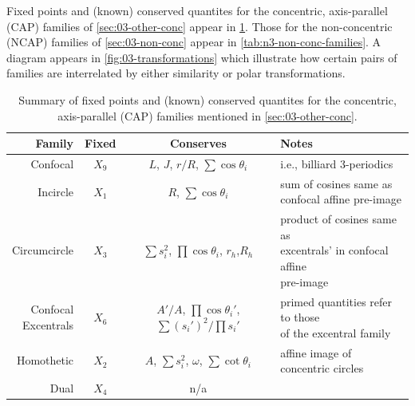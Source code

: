 Fixed points and (known) conserved quantites for the concentric, axis-parallel (CAP) families of \cref{sec:03-other-conc} appear in
\cref{tab:n3-conc-families}. Those for the non-concentric (NCAP) families of \cref{sec:03-non-conc} appear in
\cref{tab:n3-non-conc-families}. A diagram appears in \cref{fig:03-transformations} which illustrate how certain pairs of families are interrelated by either similarity or polar transformations.

\begin{table}
\centering
\begin{tabular}{|r|c|c|l|}
\hline
Family & Fixed & Conserves & Notes \\
\hline
Confocal & $X_9$ & $L$, $J$, $r/R$, $\sum\cos\theta_i$ & i.e., billiard 3-periodics \\
\hline
Incircle & $X_1$ & $R$, $\sum\cos\theta_i$ & \makecell[lc]{sum of cosines same as\\confocal affine pre-image} \\
\hline
Circumcircle & $X_3$ & \makecell[cc]{$\sum{s_i^2}$, $\prod\cos\theta_i$,\\$r_h$,$R_h$} & \makecell[lc]{product of cosines same as\\excentrals' in confocal affine\\pre-image} \\
\hline
\makecell[rc]{Confocal\\Excentrals} & $X_6$ & \makecell[cc]{$A'/A$, $\prod\cos\theta_i'$,\\$\sum{(s_i')^2}/\prod{s_i'}$} & \makecell[lc]{primed quantities refer to those\\of the excentral family}  \\
\hline
Homothetic & $X_2$ & $A$, $\sum{s_i^2}$, $\omega$, $\sum\cot\theta_i$ & affine image of concentric circles  \\
\hline
Dual & $X_4$ & n/a &  \\
\hline
\end{tabular}
\caption{Summary of fixed points and (known) conserved quantites for the concentric, axis-parallel (CAP) families mentioned in \cref{sec:03-other-conc}.}
\label{tab:n3-conc-families}
\end{table}

